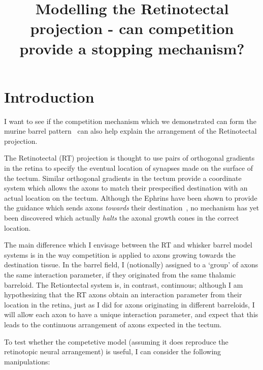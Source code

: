 \documentclass[11pt, a4paper]{article}
\title {
  Modelling the Retinotectal projection - can competition provide a stopping mechanism?
}
\date{} %
\author{\Authors}
\newcommand{\e}{\emph}
\begin{document}
\setlength{\droptitle}{-1.8cm} %
\maketitle

\vspace{-1.8cm} %

\section{Introduction}

I want to see if the competition mechanism which we demonstrated can form the
murine barrel pattern~\cite{james_modelling_2020} can also help explain the
arrangement of the Retinotectal projection.

The Retinotectal (RT) projection is thought to use pairs of orthogonal
gradients in the retina to specify the eventual location of synapses made on
the surface of the tectum. Similar orthogonal gradients in the tectum provide
a coordinate system which allows the axons to match their prespecified
destination with an actual location on the tectum. Although the Ephrins have
been shown to provide the guidance which sends axons \e{towards} their
destination~\cite{feldheim_genetic_2000}, no mechanism has yet been discovered
which actually \e{halts} the axonal growth cones in the correct location.

The main difference which I envisage between the RT and whisker barrel model
systems is in the way competition is applied to axons growing towards the
destination tissue. In the barrel field, I (notionally) assigned to a `group'
of axons the same interaction parameter, if they originated from the same
thalamic barreloid. The Retiontectal system is, in contrast, continuous;
although I am hypothesizing that the RT axons obtain an interaction parameter
from their location in the retina, just as I did for axons originating in
different barreloids, I will allow each axon to have a unique interaction
parameter, and expect that this leads to the continuous arrangement of axons
expected in the tectum.

To test whether the competetive model (assuming it does reproduce the
retinotopic neural arrangement) is useful, I can consider the following
manipulations:
\end{document}
